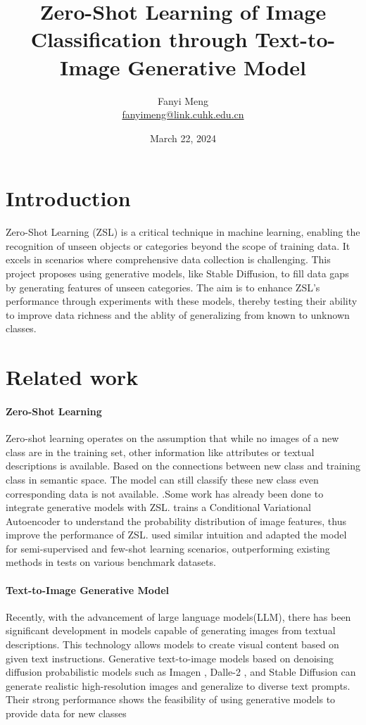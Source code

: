 \documentclass[a4paper,11pt]{scrartcl}
\title{Zero-Shot Learning of Image Classification through Text-to-Image Generative Model}
\author{Fanyi Meng \\ \url{fanyimeng@link.cuhk.edu.cn}}
\date{March 22, 2024}
\begin{document}
\maketitle

\section{Introduction}
Zero-Shot Learning (ZSL) is a critical technique in machine learning,
enabling the recognition of unseen objects or categories beyond the scope of  training data. 
It excels in scenarios where comprehensive data collection is challenging.
This project proposes using generative models, like Stable Diffusion,
to fill data gaps by generating features of unseen categories.
The aim is to enhance ZSL's performance through experiments with these models,
thereby testing their ability to improve data richness and the ablity of generalizing  from known to unknown classes. 

\section{Related work}
\paragraph{Zero-Shot Learning} 
Zero-shot learning operates on the assumption that while no images of a new class are in the training set, 
other information like attributes or textual descriptions is available. 
Based on the connections between new class and training class in semantic space. 
The model can still classify these new class even corresponding data is not available. 
\citep{yu2010attribute}.Some work has already been done to integrate generative models with ZSL. \cite{mishra2018generative}
 trains a  Conditional Variational Autoencoder to understand the probability distribution
  of image features, thus improve the performance of ZSL. \cite{wang2018zero} used similar
   intuition and adapted the model for semi-supervised 
   and few-shot learning scenarios, 
   outperforming existing methods in tests on various benchmark datasets.







\paragraph{Text-to-Image Generative Model} 
Recently, with the advancement of large language models(LLM), 
there has been significant development in models capable of generating images from 
textual descriptions. 
This technology allows models to create visual content based on given text instructions.
Generative text-to-image models based on denoising diffusion probabilistic models
 \citep{ho2020denoising} such as Imagen \citep{saharia2022palette},
  Dalle-2 \citep{ramesh2022hierarchical}, and Stable Diffusion \citep{rombach2022high} 
can generate realistic high-resolution images and generalize to diverse text prompts. 
Their strong performance shows the feasibility of using generative models to provide data for new classes
\end{document}
